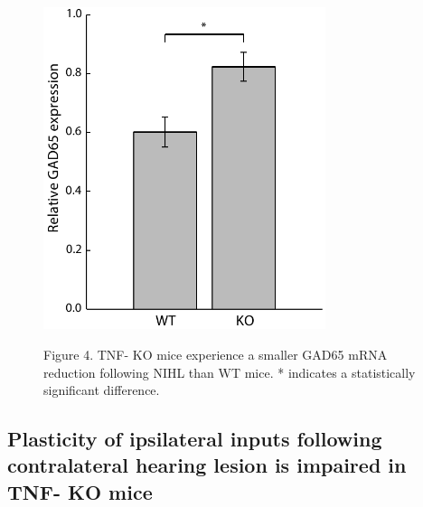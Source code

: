 \begin{figure}[h]
	\centering
		\includegraphics[width=3.25in]{images/C4F4}
	\begin{changemargin}{1in}{1in}
	\footnotesize{Figure 4. TNF-\textalpha{} KO mice experience a smaller GAD65 mRNA reduction following NIHL than WT mice. * indicates a statistically significant difference.}
	\end{changemargin}
\end{figure}

\subsection{Plasticity of ipsilateral inputs following contralateral hearing lesion is impaired in TNF-\textalpha{} KO mice}

